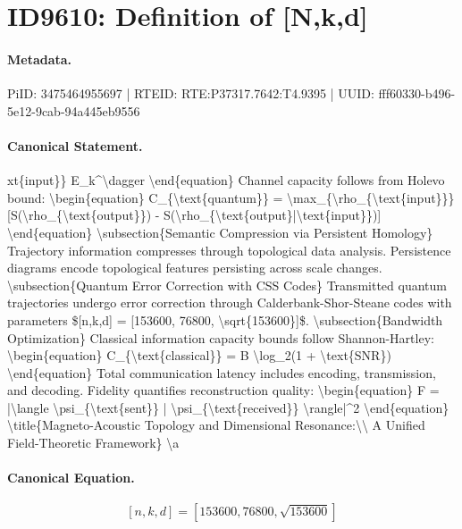 \section*{ID9610: Definition of [N,k,d]}
\paragraph{Metadata.}
PiID: 3475464955697 | RTEID: RTE:P37317.7642:T4.9395 | UUID: fff60330-b496-5e12-9cab-94a445eb9556

\paragraph{Canonical Statement.}
xt\{input\}\} E\_k\textasciicircum{}\textbackslash{}dagger \textbackslash{}end\{equation\} Channel capacity follows from Holevo bound: \textbackslash{}begin\{equation\} C\_\{\textbackslash{}text\{quantum\}\} = \textbackslash{}max\_\{\textbackslash{}rho\_\{\textbackslash{}text\{input\}\}\} [S(\textbackslash{}rho\_\{\textbackslash{}text\{output\}\}) - S(\textbackslash{}rho\_\{\textbackslash{}text\{output\}|\textbackslash{}text\{input\}\})] \textbackslash{}end\{equation\} \textbackslash{}subsection\{Semantic Compression via Persistent Homology\} Trajectory information compresses through topological data analysis. Persistence diagrams encode topological features persisting across scale changes. \textbackslash{}subsection\{Quantum Error Correction with CSS Codes\} Transmitted quantum trajectories undergo error correction through Calderbank-Shor-Steane codes with parameters \$[n,k,d] = [153600, 76800, \textbackslash{}sqrt\{153600\}]\$. \textbackslash{}subsection\{Bandwidth Optimization\} Classical information capacity bounds follow Shannon-Hartley: \textbackslash{}begin\{equation\} C\_\{\textbackslash{}text\{classical\}\} = B \textbackslash{}log\_2(1 + \textbackslash{}text\{SNR\}) \textbackslash{}end\{equation\} Total communication latency includes encoding, transmission, and decoding. Fidelity quantifies reconstruction quality: \textbackslash{}begin\{equation\} F = |\textbackslash{}langle \textbackslash{}psi\_\{\textbackslash{}text\{sent\}\} | \textbackslash{}psi\_\{\textbackslash{}text\{received\}\} \textbackslash{}rangle|\textasciicircum{}2 \textbackslash{}end\{equation\} \textbackslash{}title\{Magneto-Acoustic Topology and Dimensional Resonance:\textbackslash{}\textbackslash{} A Unified Field-Theoretic Framework\} \textbackslash{}a

\paragraph{Canonical Equation.}
\[
[n,k,d] = [153600, 76800, \sqrt{153600}]
\]

